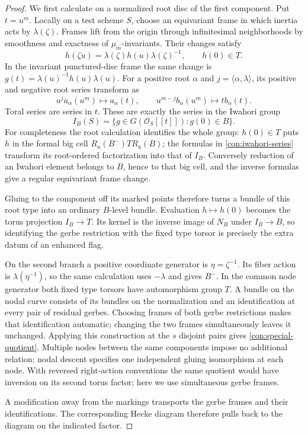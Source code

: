 \begin{proof}
We first calculate on a normalized root disc of the first component.
Put $t=u^m$.  Locally on a test scheme $S$, choose an equivariant
frame in which inertia acts by $\lambda(\zeta)$.  Frames lift from
the origin through infinitesimal neighborhoods by smoothness and
exactness of $\mu_m$-invariants.  Their changes satisfy
\[
 h(\zeta u)=\lambda(\zeta)h(u)\lambda(\zeta)^{-1},
 \qquad h(0)\in T.
\]
In the invariant punctured-disc frame the same change is
$g(t)=\lambda(u)^{-1}h(u)\lambda(u)$.  For a positive root $\alpha$
and $j=\langle\alpha,\lambda\rangle$, its positive and negative root
series transform as
\begin{equation}\label{con:iwahori-series}
 u^j a_\alpha(u^m)\longmapsto a_\alpha(t),
 \qquad
 u^{m-j}b_\alpha(u^m)\longmapsto t b_\alpha(t).
\end{equation}
Toral series are series in $t$.  These are exactly the series in
the Iwahori group
\[
 I_B(S)=\{g\in G(\mathcal O_S[[t]]):g(0)\in B\}.
\]
For completeness the root calculation identifies the whole group:
$h(0)\in T$ puts $h$ in the formal big cell $R_u(B^-)TR_u(B)$;
the formulas in \eqref{con:iwahori-series} transform its root-ordered
factorization into that of $I_B$.  Conversely reduction of an
Iwahori element belongs to $B$, hence to that big cell, and the
inverse formulas give a regular equivariant frame change.

Gluing to the component off its marked points therefore turns a
bundle of this root type into an ordinary $B$-level bundle.
Evaluation $h\mapsto h(0)$ becomes the torus projection $I_B\to T$.
Its kernel is the inverse image of $N_B$ under $I_B\to B$, so
identifying the gerbe restriction with the fixed type torsor is
precisely the extra datum of an enhanced flag.

On the second branch a positive coordinate generator is
$\eta=\zeta^{-1}$.  Its fiber action is
$\lambda(\eta^{-1})$, so the same calculation uses $-\lambda$ and
gives $B^-$.  In the common node generator both fixed type torsors
have automorphism group $T$.  A bundle on the nodal curve consists
of its bundles on the normalization and an identification at every
pair of residual gerbes.  Choosing frames of both gerbe restrictions
makes that identification automatic; changing the two frames
simultaneously leaves it unchanged.  Applying this construction at
the $s$ disjoint pairs gives \eqref{con:special-quotient}.  Multiple
nodes between the same components impose no additional relation:
nodal descent specifies one independent gluing isomorphism at each
node.  With reversed right-action conventions the same quotient
would have inversion on its second torus factor; here we use
simultaneous gerbe frames.

A modification away from the markings transports the gerbe frames
and their identifications.  The corresponding Hecke diagram
therefore pulls back to the diagram on the indicated factor.
\end{proof}

